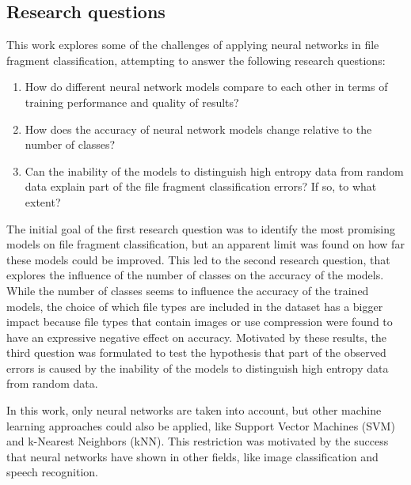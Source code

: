\subsection{Research questions}
This work explores some of the challenges of applying neural networks in file fragment classification, attempting to answer the following research questions:

\begin{enumerate}[itemindent=\parindent,label=\textbf{Q\arabic*.}]

    \item How do different neural network models compare to each other in terms of training performance and quality of results?
    
    \item How does the accuracy of neural network models change relative to the number of classes?

    \item Can the inability of the models to distinguish high entropy data from random data explain part of the file fragment classification errors? If so, to what extent?
\end{enumerate}

The initial goal of the first research question was to identify the most promising models on file fragment classification, but an apparent limit was found on how far these models could be improved.
This led to the second research question, that explores the influence of the number of classes on the accuracy of the models. While the number of classes seems to influence the accuracy of the trained models, the choice of which file types are included in the dataset has a bigger impact because file types that contain images or use compression were found to have an expressive negative effect on accuracy.
Motivated by these results, the third question was formulated to test the hypothesis that part of the observed errors is caused by the inability of the models to distinguish high entropy data from random data.

In this work, only neural networks are taken into account, but other machine learning approaches could also be applied, like Support Vector Machines (SVM) and k-Nearest Neighbors (kNN). This restriction was motivated by the success that neural networks have shown in other fields, like image classification and speech recognition.
